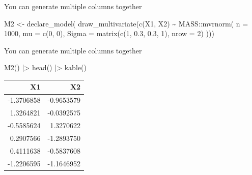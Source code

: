 \documentclass[
  11pt,
  ignorenonframetext,
]{beamer}
\newenvironment{Shaded}{\begin{snugshade}}{\end{snugshade}}
\newcommand{\AttributeTok}[1]{\textcolor[rgb]{0.40,0.45,0.13}{#1}}
\newcommand{\DecValTok}[1]{\textcolor[rgb]{0.68,0.00,0.00}{#1}}
\newcommand{\FloatTok}[1]{\textcolor[rgb]{0.68,0.00,0.00}{#1}}
\newcommand{\FunctionTok}[1]{\textcolor[rgb]{0.28,0.35,0.67}{#1}}
\newcommand{\NormalTok}[1]{\textcolor[rgb]{0.00,0.23,0.31}{#1}}
\newcommand{\OtherTok}[1]{\textcolor[rgb]{0.00,0.23,0.31}{#1}}
\newcommand{\SpecialCharTok}[1]{\textcolor[rgb]{0.37,0.37,0.37}{#1}}
\begin{document}
\begin{frame}[fragile]{You can generate multiple columns together}
\protect\hypertarget{you-can-generate-multiple-columns-together}{}
\begin{Shaded}
\begin{Highlighting}[]
\NormalTok{M2 }\OtherTok{\textless{}{-}}
  \FunctionTok{declare\_model}\NormalTok{(}
    \FunctionTok{draw\_multivariate}\NormalTok{(}\FunctionTok{c}\NormalTok{(X1, X2) }\SpecialCharTok{\textasciitilde{}}\NormalTok{ MASS}\SpecialCharTok{::}\FunctionTok{mvrnorm}\NormalTok{(}
      \AttributeTok{n =} \DecValTok{1000}\NormalTok{,}
      \AttributeTok{mu =} \FunctionTok{c}\NormalTok{(}\DecValTok{0}\NormalTok{, }\DecValTok{0}\NormalTok{),}
      \AttributeTok{Sigma =} \FunctionTok{matrix}\NormalTok{(}\FunctionTok{c}\NormalTok{(}\DecValTok{1}\NormalTok{, }\FloatTok{0.3}\NormalTok{, }\FloatTok{0.3}\NormalTok{, }\DecValTok{1}\NormalTok{), }\AttributeTok{nrow =} \DecValTok{2}\NormalTok{)}
\NormalTok{    )))}
\end{Highlighting}
\end{Shaded}
\end{frame}

\begin{frame}[fragile]{You can generate multiple columns together}
\protect\hypertarget{you-can-generate-multiple-columns-together-1}{}
\begin{Shaded}
\begin{Highlighting}[]
\FunctionTok{M2}\NormalTok{() }\SpecialCharTok{|\textgreater{}} \FunctionTok{head}\NormalTok{() }\SpecialCharTok{|\textgreater{}} \FunctionTok{kable}\NormalTok{()}
\end{Highlighting}
\end{Shaded}

\begin{tabular}{r|r}
\hline
X1 & X2\\
\hline
-1.3706858 & -0.9653579\\
\hline
1.3264821 & -0.0392575\\
\hline
-0.5585624 & 1.3270622\\
\hline
0.2907566 & -1.2893750\\
\hline
0.4111638 & -0.5837608\\
\hline
-1.2206595 & -1.1646952\\
\hline
\end{tabular}
\end{frame}
\end{document}

